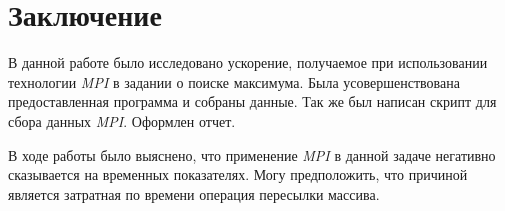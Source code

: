 \documentclass[a4paper, 12pt]{article}
\begin{document}




\section{Заключение}

В данной работе было исследовано ускорение, получаемое при использовании технологии \textit{MPI} в задании о поиске максимума.
Была усовершенствована предоставленная программа и собраны данные.
Так же был написан скрипт для сбора данных \textit{MPI}.
Оформлен отчет.

В ходе работы было выяснено, что применение \textit{MPI} в данной задаче негативно сказывается на временных показателях.
Могу предположить, что причиной является затратная по времени операция пересылки массива.


\end{document}
